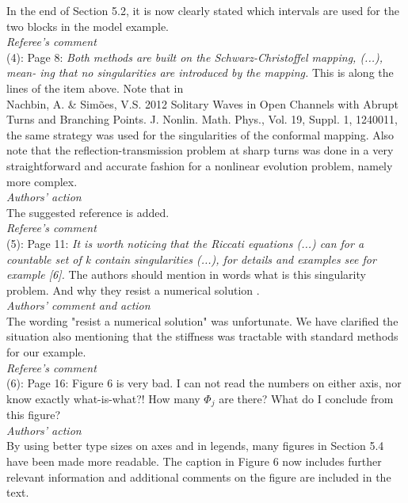 \documentclass[a4paper,12pt]{article}%
\begin{document}
In the end of Section 5.2, it is now clearly stated which intervals
are used for the two blocks in the model example.\\
\newline
{\it Referee's comment}\\
(4): Page 8: \textit{Both methods are built on the Schwarz-Christoffel
  mapping, (...), mean- ing that no singularities are introduced by
  the mapping.} This is along the lines of the
item above. Note that in\\
Nachbin, A. \& Sim\~oes, V.S. 2012 Solitary Waves in Open Channels
with Abrupt
Turns and Branching Points. J. Nonlin. Math. Phys., Vol. 19, Suppl. 1, 1240011,\\
the same strategy was used for the singularities of the conformal
mapping. Also note that the reflection-transmission problem at sharp
turns was done in a very straightforward
and accurate fashion for a nonlinear evolution problem, namely more complex.\\
{\it Authors' action}\\
The suggested reference is added.\\
\newline
{\it Referee's comment}\\
(5): Page 11: \textit{It is worth noticing that the Riccati equations
  (...) can for a countable set of k contain singularities (...), for
  details and examples see for example [6].} The authors should
mention in words what is this singularity problem. And why they resist
a numerical solution .\\
{\it Authors' comment and action}\\
The wording "resist a numerical solution" was unfortunate. We have
clarified the situation also mentioning that the stiffness was
tractable with standard methods for our example.\\
\newline
{\it Referee's comment}\\
(6): Page 16: Figure 6 is very bad. I can not read the numbers on
either axis, nor know exactly what-is-what?! How many $\Phi_j$ are
there? What do I conclude from this figure?\\
{\it Authors' action}\\
By using better type sizes on axes and in legends, many figures in
Section 5.4 have been made more readable. The caption in Figure 6 now
includes further relevant information and additional comments on the
figure are included in the text.\\
\newline
\end{document}
